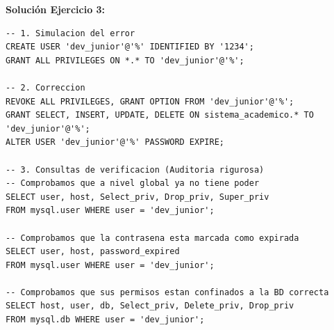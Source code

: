\documentclass[12pt,a4paper]{article}
\begin{document}
\textbf{Solución Ejercicio 3:}
\begin{lstlisting}
-- 1. Simulacion del error
CREATE USER 'dev_junior'@'%' IDENTIFIED BY '1234';
GRANT ALL PRIVILEGES ON *.* TO 'dev_junior'@'%';

-- 2. Correccion
REVOKE ALL PRIVILEGES, GRANT OPTION FROM 'dev_junior'@'%';
GRANT SELECT, INSERT, UPDATE, DELETE ON sistema_academico.* TO 'dev_junior'@'%';
ALTER USER 'dev_junior'@'%' PASSWORD EXPIRE;

-- 3. Consultas de verificacion (Auditoria rigurosa)
-- Comprobamos que a nivel global ya no tiene poder
SELECT user, host, Select_priv, Drop_priv, Super_priv 
FROM mysql.user WHERE user = 'dev_junior';

-- Comprobamos que la contrasena esta marcada como expirada
SELECT user, host, password_expired 
FROM mysql.user WHERE user = 'dev_junior';

-- Comprobamos que sus permisos estan confinados a la BD correcta
SELECT host, user, db, Select_priv, Delete_priv, Drop_priv 
FROM mysql.db WHERE user = 'dev_junior';
\end{lstlisting}
\end{document}
